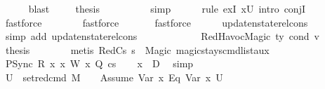 \begin{isabellebody}
\ \ \ \ \isamarkupfalse%
\ blast\ \isanewline
\ \ \isamarkupfalse%
\ {\isacharquery}{\kern0pt}thesis\ \ \ \ \isanewline
\ \ \ \ \isamarkupfalse%
\ {\isacharparenleft}{\kern0pt}simp{\isacharparenright}{\kern0pt}\isanewline
\ \ \ \ \isamarkupfalse%
\ {\isacharparenleft}{\kern0pt}rule\ exI{\isacharbrackleft}{\kern0pt}\ {\isacharquery}{\kern0pt}x{\isacharequal}{\kern0pt}U{}{\isacharbrackright}{\kern0pt}{\isacharcomma}{\kern0pt}\ intro\ conjI{\isacharparenright}{\kern0pt}\isanewline
\ \ \ \ \ \ \ \isamarkupfalse%
\ fastforce\isanewline
\ \ \ \ \ \ \isamarkupfalse%
\ fastforce\isanewline
\ \ \ \ \ \isamarkupfalse%
\ fastforce\isanewline
\ \ \ \ \isamarkupfalse%
\ update{\isacharunderscore}{\kern0pt}nstate{\isacharunderscore}{\kern0pt}rel{\isacharunderscore}{\kern0pt}cons\isanewline
\ \ \ \ \isamarkupfalse%
\ {\isacharparenleft}{\kern0pt}simp\ add{\isacharcolon}{\kern0pt}\ update{\isacharunderscore}{\kern0pt}nstate{\isacharunderscore}{\kern0pt}rel{\isacharunderscore}{\kern0pt}cons{\isacharparenright}{\kern0pt}\ \ \ \ \isanewline
\ \ \isamarkupfalse%
\isanewline
\ \ \ \ \isamarkupfalse%
\ {\isacharparenleft}{\kern0pt}RedHavocMagic\ ty\ cond\ v{\isacharparenright}{\kern0pt}\isanewline
\ \ \ \ \isamarkupfalse%
\ {\isacharquery}{\kern0pt}thesis\isanewline
\ \ \ \ \ \ \isamarkupfalse%
\ {\isacharparenleft}{\kern0pt}metis\ RedCs{}\ {\isacartoucheopen}s{\isacharprime}{\kern0pt}\ {\isasymnoteq}\ Magic{\isacartoucheclose}\ magic{\isacharunderscore}{\kern0pt}stays{\isacharunderscore}{\kern0pt}cmd{\isacharunderscore}{\kern0pt}list{\isacharunderscore}{\kern0pt}aux{\isacharparenright}{\kern0pt}\ \isanewline
\ \ \isamarkupfalse%
\isanewline
{}\isamarkupfalse%
\isanewline
\ \ \isamarkupfalse%
\ {\isacharparenleft}{\kern0pt}PSync\ R\ x\ x{}\ W\ x{}\ Q\ cs{\isacharparenright}{\kern0pt}\isanewline
\ \ \isamarkupfalse%
\ {\isachardoublequoteopen}x{}\ {\isasymnotin}\ D{}{\isachardoublequoteclose}\ \isamarkupfalse%
\ simp\isanewline
\ \ \isamarkupfalse%
\ {\isacharquery}{\kern0pt}U{}\ {\isacharequal}{\kern0pt}\ {\isachardoublequoteopen}{\isacharparenleft}{\kern0pt}set{\isacharunderscore}{\kern0pt}red{\isacharunderscore}{\kern0pt}cmd\ M\ {\isasymLambda}{\isacharprime}{\kern0pt}\ {\isasymGamma}\ {\isasymOmega}\ {\isacharparenleft}{\kern0pt}Assume\ {\isacharparenleft}{\kern0pt}{\isacharparenleft}{\kern0pt}Var\ x{}{\isacharparenright}{\kern0pt}\ {\isasymguillemotleft}Eq{\isasymguillemotright}\ {\isacharparenleft}{\kern0pt}Var\ x{}{\isacharparenright}{\kern0pt}{\isacharparenright}{\kern0pt}{\isacharparenright}{\kern0pt}\ U{}{\isacharparenright}{\kern0pt}{\isachardoublequoteclose}\isanewline

\end{isabellebody}
